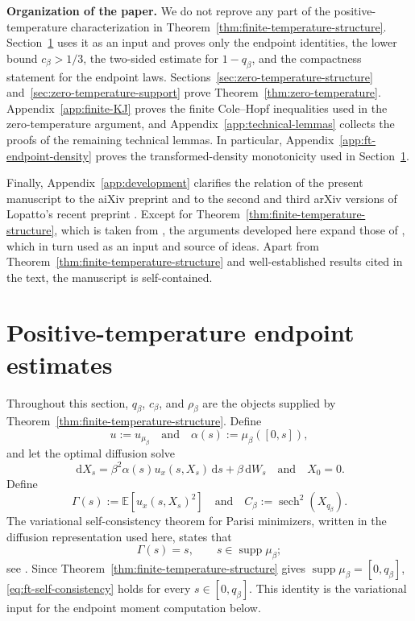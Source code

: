 \documentclass[10pt]{amsart}
\theoremstyle{definition}
\theoremstyle{remark}
\numberwithin{equation}{section}
\newcommand{\E}{\mathbb E}
\newcommand{\1}{\mathbf 1}
\newcommand{\supp}{\operatorname{supp}}
\newcommand{\sech}{\operatorname{sech}}
\newcommand{\dd}{\,\mathrm d}
\begin{document}
\noindent
\textbf{Organization of the paper.}
We do not reprove any part of the positive-temperature characterization in Theorem~\ref{thm:finite-temperature-structure}. Section~\ref{sec:finite-temperature-proof} uses it as an input and proves only the endpoint identities, the lower bound $c_\beta>1/3$, the two-sided estimate for $1-q_\beta$, and the compactness statement for the endpoint laws. Sections~\ref{sec:zero-temperature-structure} and~\ref{sec:zero-temperature-support} prove Theorem~\ref{thm:zero-temperature}. Appendix~\ref{app:finite-KJ} proves the finite Cole--Hopf inequalities used in the zero-temperature argument, and Appendix~\ref{app:technical-lemmas} collects the proofs of the remaining technical lemmas. In particular, Appendix~\ref{app:ft-endpoint-density} proves the transformed-density monotonicity used in Section~\ref{sec:finite-temperature-proof}.

Finally, Appendix~\ref{app:development} clarifies the relation of the present manuscript to the aiXiv preprint \cite{AIxivPreprint} and to the second and third arXiv versions of Lopatto's recent preprint \cite{Lopatto2026v2,Lopatto2026}. Except for Theorem~\ref{thm:finite-temperature-structure}, which is taken from \cite{Lopatto2026}, the arguments developed here expand those of \cite{AIxivPreprint}, which in turn used \cite{Lopatto2026v2} as an input and source of ideas. Apart from Theorem~\ref{thm:finite-temperature-structure} and well-established results cited in the text, the manuscript is self-contained.






\section{Positive-temperature endpoint estimates}
\label{sec:finite-temperature-proof}

Throughout this section, $q_\beta$, $c_\beta$, and $\rho_\beta$ are the objects supplied by Theorem~\ref{thm:finite-temperature-structure}. Define
\begin{equation*}
 u:=u_{\mu_\beta}
 \quad\text{and}\quad
 \alpha(s):=\mu_\beta([0,s]),
\end{equation*}
and let the optimal diffusion solve
\begin{equation*}
 \dd X_s=\beta^2\alpha(s)u_x(s,X_s)\dd s+\beta\dd W_s
 \quad\text{and}\quad X_0=0.
\end{equation*}
Define
\begin{equation*}
 \Gamma(s):=\E[u_x(s,X_s)^2]
 \quad\text{and}\quad
 C_\beta:=\sech^2(X_{q_\beta}).
\end{equation*}
The variational self-consistency theorem for Parisi minimizers, written in the diffusion representation used here, states that
\begin{equation}
 \Gamma(s)=s,
 \qquad
 s\in\supp\mu_\beta;
 \label{eq:ft-self-consistency}
\end{equation}
see \cite[Theorem~5]{AuffingerChenProperties}. Since Theorem~\ref{thm:finite-temperature-structure} gives $\supp\mu_\beta=[0,q_\beta]$, \eqref{eq:ft-self-consistency} holds for every $s\in[0,q_\beta]$. This identity is the variational input for the endpoint moment computation below.
\end{document}
